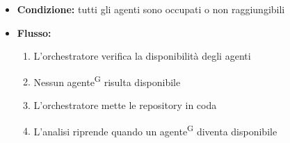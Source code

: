 \documentclass[a4paper, 11pt]{article}
\begin{document}
\begin{itemize}
\begin{itemize}
\begin{itemize}
				\item \textbf{Condizione:} tutti gli agenti sono occupati o non raggiungibili
				\item \textbf{Flusso:}
				\begin{enumerate}
					\item L'orchestratore verifica la disponibilità degli agenti
					\item Nessun agente\textsuperscript{G} risulta disponibile
					\item L'orchestratore mette le repository in coda
					\item L'analisi riprende quando un agente\textsuperscript{G} diventa disponibile
				\end{enumerate}
			\end{itemize}
	\end{itemize}
\end{itemize}
\end{document}

